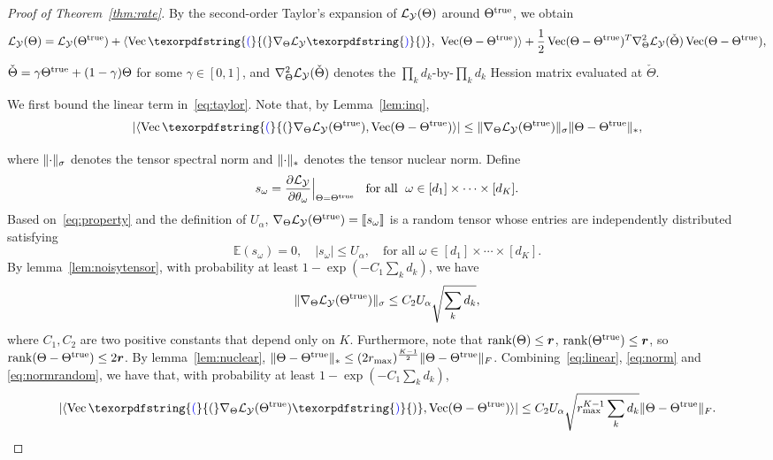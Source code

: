 \documentclass[11pt]{article}
\theoremstyle{plain}
\theoremstyle{definition}
\providecommand{\DIFaddtex}[1]{{\protect\color{blue}\uwave{#1}}} %
\providecommand{\DIFaddbegin}{} %
\providecommand{\DIFaddend}{} %
\providecommand{\DIFadd}[1]{\texorpdfstring{\DIFaddtex{#1}}{#1}} %
\begin{document}
\begin{proof}[Proof of Theorem~\ref{thm:rate}]
By the second-order Taylor's expansion of $\mathcal{L}_{\mathcal{Y}}(\Theta)$ around $\Theta^{\text{true}}$, we obtain
\begin{equation}\label{eq:taylor}
\flogl(\Theta)=\flogl(\trueT)+\langle\DIFaddbegin \Vec\DIFadd{(}\DIFaddend \fplogl\DIFaddbegin \DIFadd{)}\DIFaddend ,\ \Vec(\Theta-\trueT)\rangle+{1\over 2}\Vec(\Theta-\trueT)^T\fpplogl(\check\Theta)\Vec(\Theta-\trueT),
\end{equation}
$\check\Theta=\gamma\Theta^{\text{true}}+(1-\gamma)\Theta$ for some $\gamma\in[0,1]$, and $\nabla^2_{\Theta}\mathcal{L}_{\mathcal{Y}}(\check\Theta)$ denotes the $\prod_kd_k$-by-$\prod_k d_k$ Hession matrix evaluated at $\check\Theta$.

We first bound the linear term in~\eqref{eq:taylor}. Note that, by Lemma~\ref{lem:inq},
\begin{equation}\label{eq:linear}
|\DIFaddbegin \langle\Vec\DIFadd{(}\DIFaddend \fplogl(\trueT), \Vec(\Theta-\trueT)  \rangle|\leq \snormSize{}{\fplogl(\trueT)} \nnormSize{}{\Theta-\trueT},
\end{equation}
where $\lVert\cdot\rVert_\sigma$ denotes the tensor spectral norm and $\lVert\cdot\rVert_*$ denotes the tensor nuclear norm. Define
\[
s_\omega={\partial \mathcal{L}_{\mathcal{Y}}\over \partial \theta_\omega}\Big|_{\Theta=\Theta^{\text{true}}} \;\; \textrm{ for all } \; \omega\in[d_1]\times\cdots\times [d_K].
\]
Based on~\eqref{eq:property} and the definition of $U_\alpha$, $\nabla_{\Theta}\mathcal{L}_{\mathcal{Y}}(\Theta^{\text{true}})=\llbracket s_{\omega} \rrbracket$ is a random tensor whose entries are independently distributed satisfying
\begin{equation}\label{eq:norm}
\mathbb{E}(s_\omega)=0,\quad |s_\omega|\leq U_\alpha, \quad \text{for all }\omega\in[d_1]\times \cdots \times [d_K].
\end{equation}
By lemma~\ref{lem:noisytensor}, with probability at least $1-\exp(-C_1 \sum_kd_k)$, we have
\begin{equation}\label{eq:normrandom}
\lVert\nabla_{\Theta}\mathcal{L}_{\mathcal{Y}}(\Theta^{\text{true}})\rVert_\sigma \leq C_2 U_\alpha\sqrt{\sum_k d_k},
\end{equation}
where $C_1, C_2$ are two positive constants that depend only on $K$. Furthermore, note that $\text{rank}(\Theta)\leq \bm{r}$, $\text{rank}(\Theta^{\text{true}})\leq \bm{r}$, so $\text{rank}(\Theta-\Theta^{\text{true}})\leq 2\bm{r}$. By lemma~\ref{lem:nuclear}, $\lVert\Theta-\Theta^{\text{true}}\rVert_*\leq (2r_{\max})^{K-1\over 2}\lVert\Theta-\Theta^{\text{true}}\rVert_F$. Combining~\eqref{eq:linear}, \eqref{eq:norm} and \eqref{eq:normrandom}, we have that, with probability at least $1-\exp(-C_1 \sum_kd_k)$,
\begin{equation}\label{eq:linearconclusion}
|\langle \DIFaddbegin \Vec\DIFadd{(}\DIFaddend \fplogl(\trueT)\DIFaddbegin \DIFadd{)}\DIFaddend , \Vec(\Theta-\trueT)  \rangle | \leq C_2 U_\alpha  \sqrt{r_{\max}^{K-1} \sum_k d_k}  \FnormSize{}{\Theta-\trueT}.
\end{equation}


\end{proof}
\end{document}
